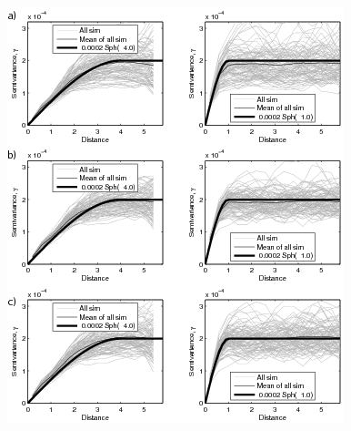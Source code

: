 \documentclass[12t]{article}
\begin{document}
\clearpage
\begin{figure}
  \centering
  \includegraphics{manfig_14}
  \caption[Experimental semivariograms of 100 unconditional realizations using the target histogram properties as given in Figure \ref{fig:dssim_covlookup_coverage}. 
top) Gaussian target histogram.
middle) bimodal target histogram.
bottom) bimodal target histogram using a wider and more densely sampling of mean and variances in normal score space.
]{}
\label{fig:dssim_uncond_semivar}
\end{figure}
\end{document}
